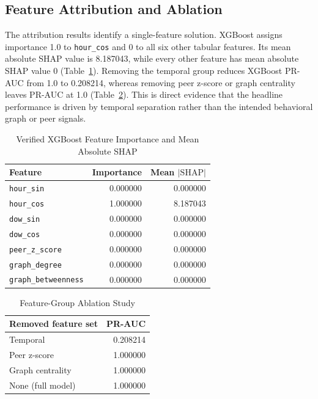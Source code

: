 \subsection{Feature Attribution and Ablation}
The attribution results identify a single-feature solution. XGBoost assigns importance 1.0 to \texttt{hour\_cos} and 0 to all six other tabular features. Its mean absolute SHAP value is 8.187043, while every other feature has mean absolute SHAP value 0 (Table~\ref{tab:attribution}). Removing the temporal group reduces XGBoost PR-AUC from 1.0 to 0.208214, whereas removing peer z-score or graph centrality leaves PR-AUC at 1.0 (Table~\ref{tab:ablation}). This is direct evidence that the headline performance is driven by temporal separation rather than the intended behavioral graph or peer signals.

\begin{table}[!htbp]
\caption{Verified XGBoost Feature Importance and Mean Absolute SHAP}
\label{tab:attribution}
\centering
\begin{tabular}{lrr}
\toprule
Feature & Importance & Mean $|\mathrm{SHAP}|$ \\
\midrule
\texttt{hour\_sin} & 0.000000 & 0.000000 \\
\texttt{hour\_cos} & 1.000000 & 8.187043 \\
\texttt{dow\_sin} & 0.000000 & 0.000000 \\
\texttt{dow\_cos} & 0.000000 & 0.000000 \\
\texttt{peer\_z\_score} & 0.000000 & 0.000000 \\
\texttt{graph\_degree} & 0.000000 & 0.000000 \\
\texttt{graph\_betweenness} & 0.000000 & 0.000000 \\
\bottomrule
\end{tabular}
\end{table}

\begin{table}[!htbp]
\caption{Feature-Group Ablation Study}
\label{tab:ablation}
\centering
\begin{tabular}{lr}
\toprule
Removed feature set & PR-AUC \\
\midrule
Temporal & 0.208214 \\
Peer z-score & 1.000000 \\
Graph centrality & 1.000000 \\
None (full model) & 1.000000 \\
\bottomrule
\end{tabular}
\end{table}

